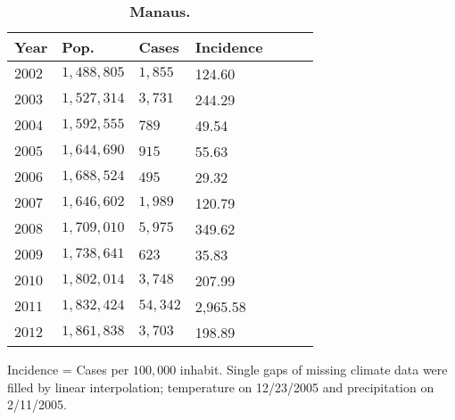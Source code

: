 \documentclass[final,leqno]{siamltexmm2}
\begin{document}
\begin{table}[!ht]
\centering
\caption{
{\bf Manaus.}}
\begin{tabular}{|l|l|l|l|l|l|l|}
\hline
\multicolumn{1}{|l|}{\bf Year} & \multicolumn{1}{|l|}{\bf Pop.} & \multicolumn{1}{|l|}{\bf Cases}&\multicolumn{1}{|l|}{\bf Incidence} \\ \hline %
$2002$ & $ 1,488,805$   & $  1,855$  &  \cellcolor{red!25}124.60    \\ \hline
$2003$ & $ 1,527,314$   & $3,731$    & \cellcolor{red!25} 244.29  \\ \hline
$2004$ & $ 1,592,555$   & $789 $     &  \cellcolor{blue!25} 49.54 \\ \hline
$2005$ & $ 1,644,690$   & $ 915 $    &  \cellcolor{blue!25}55.63   \\ \hline
$2006$ & $ 1,688,524$   & $495 $   &  \cellcolor{blue!25}29.32 \\ \hline
$2007$ & $ 1,646,602$   & $1,989$    &  \cellcolor{red!25}120.79  \\ \hline
$2008$ & $1,709,010$    & $5,975$ &  \cellcolor{red!25}349.62 \\ \hline
$2009$ & $1,738,641$    & $623$  &  \cellcolor{blue!25}35.83  \\ \hline
$2010$ & $ 1,802,014$   & $3,748$    &  \cellcolor{red!25} 207.99  \\ \hline
$2011$ & $ 1,832,424$   & $54,342$  &  \cellcolor{red!25}2,965.58 \\ \hline
$2012$ & $1,861,838$    & $3,703$  &  \cellcolor{red!25}198.89 \\ \hline
\end{tabular}
\begin{flushleft}
\vspace{.5cm}
Incidence = Cases per $100,000$ inhabit.  Single gaps of missing climate data were filled by linear interpolation; 
temperature on 12/23/2005 and precipitation on 2/11/2005.  
\end{flushleft}
\label{table5}
\end{table}
 
 
 
 
\end{document}
